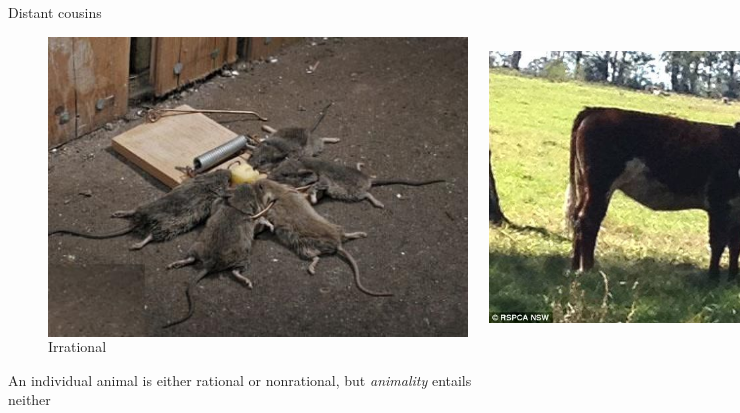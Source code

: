 \documentclass[xcolor=dvipsnames]{beamer}
\begin{document}
\begin{frame}{Distant cousins}
\begin{figure}
  \centering
  \begin{columns}
    \centering
    \caption {Nonrational}
    \includegraphics[width=0.99\textwidth]{mouse}
    \centering
    \caption {Irrational}
    \includegraphics[width=0.99\textwidth]{cow}
  \end{columns}
\end{figure}
An individual animal is either rational or nonrational, but \emph{animality} entails neither
\end{frame}
\end{document}
